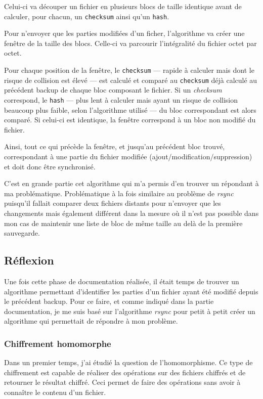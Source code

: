 \documentclass[a4paper,10pt, twoside]{report}
\begin{document}
\begin{spacing}{1.2}
Celui-ci va découper un fichier en plusieurs blocs de taille identique avant
de calculer, pour chacun, un \texttt{checksum} ainsi qu'un \texttt{hash}.

Pour n'envoyer que les parties modifiées d'un ficher, l'algorithme va créer
une fenêtre de la taille des blocs. Celle-ci va parcourir l'intégralité
du fichier octet par octet.

Pour chaque position de la fenêtre, le \texttt{checksum} --- rapide à
calculer mais dont le risque de collision est élevé --- est calculé et
comparé au \texttt{checksum} déjà calculé au précédent backup de
chaque bloc composant le fichier. Si un \textit{checksum} correspond, le
\texttt{hash} --- plus lent à calculer mais ayant un risque de collision
beaucoup plus faible, selon l'algorithme utilisé --- du bloc correspondant
est alors comparé. Si celui-ci est identique, la fenêtre correspond à un
bloc non modifié du fichier.

Ainsi, tout ce qui précède la fenêtre, et jusqu'au précédent bloc
trouvé, correspondant à une partie du fichier modifiée
(ajout/modification/suppression) et doit donc être synchronisé.

C'est en grande partie cet algorithme qui m'a permis d'en trouver un répondant
à ma problématique. Problématique à la fois similaire au problème de
\textit{rsync} puisqu'il fallait comparer deux fichiers distants pour n'envoyer
que les changements mais également différent dans la mesure où il n'est pas
possible dans mon cas de maintenir une liste de bloc de même taille au delà de
la première sauvegarde.

\subsection{Réflexion}

Une fois cette phase de documentation réalisée, il était temps de trouver
un algorithme permettant d'identifier les parties d'un fichier ayant été
modifié depuis le précédent backup. Pour ce faire, et comme indiqué
dans la partie documentation, je me suis basé sur l'algorithme \textit{rsync}
pour petit à petit créer un algorithme qui permettait de répondre à mon
problème.

\subsubsection{Chiffrement homomorphe}

Dans un premier temps, j'ai étudié la question de l'homomorphisme. Ce type
de chiffrement est capable de réaliser des opérations sur des fichiers chiffrés
et de retourner le résultat chiffré. Ceci permet de faire des opérations
sans avoir à connaître le contenu d'un fichier.


\end{spacing}
\end{document}
